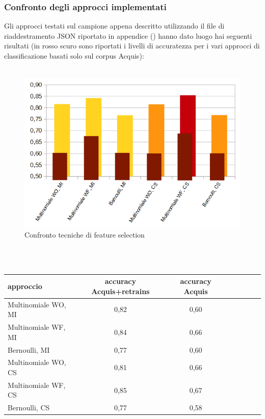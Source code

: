 \documentclass{article}
\theoremstyle{plain}
\theoremstyle{definition}
\begin{document}
\subsubsection{Confronto degli approcci implementati}
Gli approcci testati sul campione appena descritto utilizzando il file di riaddestramento JSON riportato in appendice () hanno dato luogo hai seguenti risultati (in rosso scuro sono riportati i livelli di accuratezza per i vari approcci di classificazione basati solo sul corpus Acquis):
\\
\\
\begin{figure}[htbp]
\begin{center}
\includegraphics[scale=0.70]{img/gr4.png}
\caption{Confronto tecniche di feature selection}
\end{center}
\end{figure}
\\
\\
\begin{tabular}{l*{6}{c}r}
approccio & accuracy Acquis+retrains & accuracy Acquis\\
\hline
Multinomiale WO, MI	& 0,82 & 0,60 \\
Multinomiale WF, MI & 0,84 & 0,66 \\
Bernoulli, MI & 0,77 & 0,60 \\
Multinomiale WO, CS & 0,81 & 0,66 \\
Multinomiale WF, CS & 0,85 & 0,67 \\
Bernoulli, CS & 0,77 & 0,58
\end{tabular}
\end{document}
